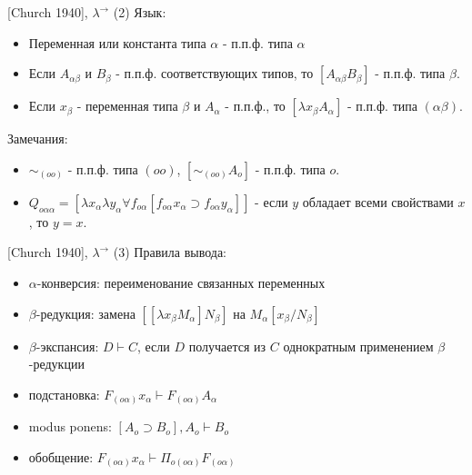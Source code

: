 \documentclass{beamer}
\begin{document}
\begin{frame}{[Church 1940], $\lambda^\to$ (2)}
Язык:\\
\bigskip
\begin{itemize}
  \item Переменная или константа типа $\alpha$ - п.п.ф. типа $\alpha$ 
  \item Если $A_{\alpha\beta}$ и $B_{\beta}$ - п.п.ф. соответствующих типов, то $[A_{\alpha\beta}B_\beta]$ - п.п.ф. типа $\beta$.
  \item Если $x_\beta$ - переменная типа $\beta$ и $A_\alpha$ - п.п.ф., то $[\lambda x_\beta A_\alpha]$ - п.п.ф. типа $(\alpha \beta)$.
\end{itemize}
\bigskip
Замечания:\\
\begin{itemize}
  \item $\sim_{(oo)}$ - п.п.ф. типа $(oo)$, $[\sim_{(oo)}A_o]$ - п.п.ф. типа $o$.
  \item $Q_{o \alpha \alpha} = [\lambda x_\alpha \lambda y_\alpha \forall f_{o \alpha}[f_{o \alpha} x_\alpha \supset f_{o \alpha} y_\alpha]]$ - если $y$ обладает всеми свойствами $x$, то $y = x$.
\end{itemize}
\end{frame}

\begin{frame}{[Church 1940], $\lambda^\to$ (3)}
Правила вывода:\\
\bigskip
\begin{itemize}
  \item $\alpha$-конверсия: переименование связанных переменных
  \item $\beta$-редукция: замена $[[\lambda x_\beta M_\alpha] N_\beta]$ на $M_\alpha[x_\beta/N_\beta]$
  \item $\beta$-экспансия: $D \vdash C$, если $D$ получается из $C$ однократным применением $\beta$-редукции
  \item подстановка: $F_{(o \alpha)} x_\alpha \vdash F_{(o \alpha)} A_\alpha$
  \item modus ponens: $[A_o \supset B_o], A_o \vdash B_o$ 
  \item обобщение: $F_{(o \alpha)} x_\alpha \vdash \Pi_{o (o \alpha)} F_{(o \alpha)}$
\end{itemize}
\end{frame}
\end{document}
